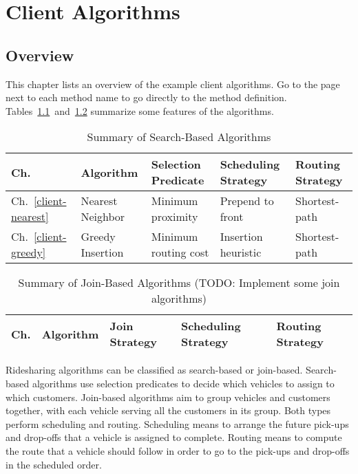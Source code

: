 \part{Client Algorithms}%
\label{part-client}

\chapter{Overview}
\label{client-overview}

\renewcommand{\thepage}{\arabic{page}}
\setcounter{page}{1}

This chapter lists an overview of the example client algorithms. Go to
the page next to each method name to go directly to the method definition.
Tables~\ref{tab:search-algorithms}~and~\ref{tab:join-algorithms} summarize some
features of the algorithms.

\begin{table}[h]
\begin{center}
\caption{Summary of Search-Based Algorithms}
\label{tab:search-algorithms}
\begin{tabular}{|l|l|l|l|l|}
\hline
Ch. & Algorithm & Selection Predicate & Scheduling Strategy & Routing Strategy \\
\hline
Ch.~\ref{client-nearest} & Nearest Neighbor & Minimum proximity & Prepend to front & Shortest-path \\
Ch.~\ref{client-greedy} & Greedy Insertion & Minimum routing cost & Insertion heuristic & Shortest-path \\
\hline
\end{tabular}
\end{center}
\end{table}

\begin{table}[h]
\begin{center}
\caption{Summary of Join-Based Algorithms (TODO: Implement some join algorithms)}
\label{tab:join-algorithms}
\begin{tabular}{|l|l|l|l|l|}
\hline
Ch. & Algorithm & Join Strategy & Scheduling Strategy & Routing Strategy \\
\hline
\end{tabular}
\end{center}
\end{table}

Ridesharing algorithms can be classified as search-based or join-based.
Search-based algorithms use selection predicates to decide which vehicles to
assign to which customers. Join-based algorithms aim to group vehicles and
customers together, with each vehicle serving all the customers in its group.
Both types perform scheduling and routing.  Scheduling means to arrange the
future pick-ups and drop-offs that a vehicle is assigned to complete. Routing
means to compute the route that a vehicle should follow in order to go to the
pick-ups and drop-offs in the scheduled order.

